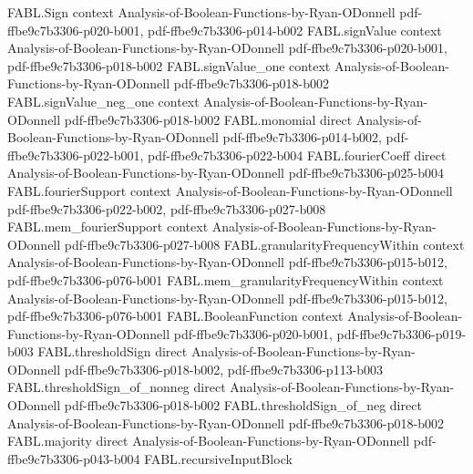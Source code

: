 \begin{theorem}
\label{FABL.majority_unanimous}
\leanok
{}
\proofstep
  {FABL.Sign}
  {context}
  {Analysis-of-Boolean-Functions-by-Ryan-ODonnell}
  {pdf-ffbe9c7b3306-p020-b001,
    pdf-ffbe9c7b3306-p014-b002}
\proofstep
  {FABL.signValue}
  {context}
  {Analysis-of-Boolean-Functions-by-Ryan-ODonnell}
  {pdf-ffbe9c7b3306-p020-b001,
    pdf-ffbe9c7b3306-p018-b002}
\proofstep
  {FABL.signValue_one}
  {context}
  {Analysis-of-Boolean-Functions-by-Ryan-ODonnell}
  {pdf-ffbe9c7b3306-p018-b002}
\proofstep
  {FABL.signValue_neg_one}
  {context}
  {Analysis-of-Boolean-Functions-by-Ryan-ODonnell}
  {pdf-ffbe9c7b3306-p018-b002}
\proofstep
  {FABL.monomial}
  {direct}
  {Analysis-of-Boolean-Functions-by-Ryan-ODonnell}
  {pdf-ffbe9c7b3306-p014-b002,
    pdf-ffbe9c7b3306-p022-b001,
    pdf-ffbe9c7b3306-p022-b004}
\proofstep
  {FABL.fourierCoeff}
  {direct}
  {Analysis-of-Boolean-Functions-by-Ryan-ODonnell}
  {pdf-ffbe9c7b3306-p025-b004}
\proofstep
  {FABL.fourierSupport}
  {context}
  {Analysis-of-Boolean-Functions-by-Ryan-ODonnell}
  {pdf-ffbe9c7b3306-p022-b002,
    pdf-ffbe9c7b3306-p027-b008}
\proofstep
  {FABL.mem_fourierSupport}
  {context}
  {Analysis-of-Boolean-Functions-by-Ryan-ODonnell}
  {pdf-ffbe9c7b3306-p027-b008}
\proofstep
  {FABL.granularityFrequencyWithin}
  {context}
  {Analysis-of-Boolean-Functions-by-Ryan-ODonnell}
  {pdf-ffbe9c7b3306-p015-b012,
    pdf-ffbe9c7b3306-p076-b001}
\proofstep
  {FABL.mem_granularityFrequencyWithin}
  {context}
  {Analysis-of-Boolean-Functions-by-Ryan-ODonnell}
  {pdf-ffbe9c7b3306-p015-b012,
    pdf-ffbe9c7b3306-p076-b001}
\proofstep
  {FABL.BooleanFunction}
  {context}
  {Analysis-of-Boolean-Functions-by-Ryan-ODonnell}
  {pdf-ffbe9c7b3306-p020-b001,
    pdf-ffbe9c7b3306-p019-b003}
\proofstep
  {FABL.thresholdSign}
  {direct}
  {Analysis-of-Boolean-Functions-by-Ryan-ODonnell}
  {pdf-ffbe9c7b3306-p018-b002,
    pdf-ffbe9c7b3306-p113-b003}
\proofstep
  {FABL.thresholdSign_of_nonneg}
  {direct}
  {Analysis-of-Boolean-Functions-by-Ryan-ODonnell}
  {pdf-ffbe9c7b3306-p018-b002}
\proofstep
  {FABL.thresholdSign_of_neg}
  {direct}
  {Analysis-of-Boolean-Functions-by-Ryan-ODonnell}
  {pdf-ffbe9c7b3306-p018-b002}
\proofstep
  {FABL.majority}
  {direct}
  {Analysis-of-Boolean-Functions-by-Ryan-ODonnell}
  {pdf-ffbe9c7b3306-p043-b004}
\proofstep
  {FABL.recursiveInputBlock}

\end{theorem}
